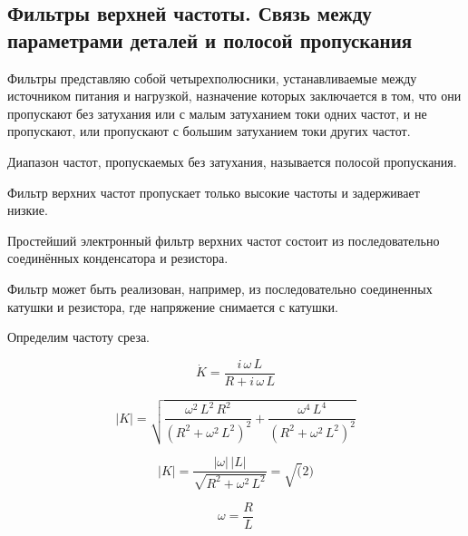 \subsection{Фильтры верхней частоты. Связь между параметрами деталей и полосой пропускания }


Фильтры представляю собой четырехполюсники, устанавливаемые между источником питания и нагрузкой, назначение которых заключается в том, что они пропускают без затухания или с малым затуханием токи одних частот, и не пропускают, или пропускают с большим затуханием токи других частот.

Диапазон частот, пропускаемых без затухания, называется полосой пропускания.

Фильтр верхних частот пропускает только высокие частоты и задерживает низкие.

Простейший электронный фильтр верхних частот состоит из последовательно соединённых конденсатора и резистора.

Фильтр может быть реализован, например, из последовательно соединенных катушки и резистора, где напряжение снимается с катушки.

Определим частоту среза.


\begin{equation}
\dot K = \frac{i\,\omega\,L}{R+i\,\omega \,L}
\end{equation}

\begin{equation}
|K| = \sqrt{\frac{{\omega}^{2}\,{L}^{2}\,{R}^{2}}{{\left( {R}^{2}+{\omega}^{2}\,{L}^{2}\right) }^{2}}+\frac{{\omega}^{4}\,{L}^{4}}{{\left( {R}^{2}+{\omega}^{2}\,{L}^{2}\right) }^{2}}}
\end{equation}


\begin{equation}
|K|=\frac{\left| \omega\right| \,\left| L\right| }{\sqrt{{R}^{2}+{\omega}^{2}\,{L}^{2}}} = \sqrt(2)
\end{equation}

\begin{equation}
\omega = \frac{R}{L}
\end{equation}


\pagebreak
